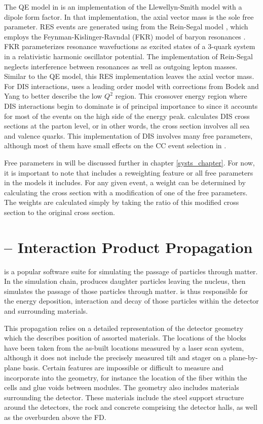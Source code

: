 The QE model in \genie is an implementation of the Llewellyn-Smith model \cite{LlewellynSmith} with a dipole form factor.  In that implementation, the axial vector mass is the sole free parameter.  RES events are generated using from the Rein-Segal model \cite{rein1981neutrino}, which employs the Feynman-Kislinger-Ravndal (FKR) model of baryon resonances \cite{feynman1971current}.  FKR parameterizes resonance wavefuctions as excited states of a 3-quark system in a relativistic harmonic oscillator potential.  The \genie implementation of Rein-Segal neglects interference between resonances as well as outgoing lepton masses.  Similar to the QE model, this RES implementation leaves the axial vector mass.  For DIS interactions, \genie uses a leading order model with corrections from Bodek and Yang \cite{bodek2003higher} to better describe the low $Q^2$ region.  This crossover energy region where DIS interactions begin to dominate is of principal importance to \nova since it accounts for most of the events on the high side of the energy peak.  \genie calculates DIS cross sections at the parton level, or in other words, the cross section involves all sea and valence quarks.  This implementation of DIS involves many free parameters, although most of them have small effects on the \numu CC event selection in \nova.

Free parameters in \genie will be discussed further in chapter \ref{systs_chapter}.  For now, it is important to note that \genie includes a reweighting feature or all free parameters in the models it includes.  For any given event, a weight can be determined by calculating the cross section with a modification of one of the free parameters.  The weights are calculated simply by taking the ratio of this modified cross section to the original cross section.


\section{\geant -- Interaction Product Propagation}

\geant \cite{geant} is a popular software suite for simulating the passage of
particles through matter.  In the \nova simulation chain, \genie produces
daughter particles leaving the nucleus, then \geant simulates the passage of
those particles through matter.  \geant is thus responsible for the energy
deposition, interaction and decay of those particles within the detector and
surrounding materials.

This propagation relies on a detailed representation of the detector geometry which the describes position of assorted materials.
The locations of the blocks have been taken from the as-built locations measured by a laser scan system, although it does not include the precisely measured tilt and stager on a plane-by-plane basis.
Certain features are impossible or difficult to measure and incorporate into
the geometry, for instance the location of the fiber within the cells and glue voids between modules.  The geometry also includes materials surrounding the detector.  These materials include the steel support structure around the detectors, the rock and concrete comprising the detector halls, as well as the overburden above the FD.

